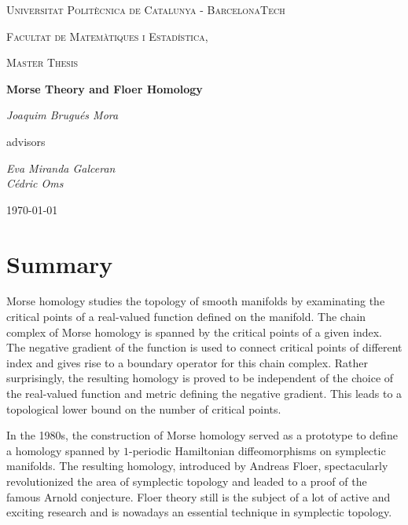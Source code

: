 \documentclass[a4paper,11pt]{book}
\begin{document}
\begin{titlepage}
	\centering
	{\scshape\LARGE Universitat Politècnica de Catalunya - BarcelonaTech\par}
	{\scshape\LARGE Facultat de Matemàtiques i Estadística, \par}
	\vspace{1cm}
	{\scshape\Large Master Thesis\par}
	\vspace{1.5cm}
	{\huge\bfseries Morse Theory and Floer Homology\par}
	\vspace{2cm}
	{\Large\itshape Joaquim Brugués Mora\par}
	\vfill
	advisors\par
	{\Large\itshape Eva Miranda Galceran \\ Cédric Oms \par}

	\vfill

	{\large \today\par}
\end{titlepage}


\chapter*{Summary}

Morse homology studies the topology of smooth manifolds by examinating the critical points of a real-valued function defined on the manifold. The chain complex of Morse homology is spanned by the critical points of a given index. The negative gradient of the function is used to connect critical points of different index and gives rise to a boundary operator for this chain complex. Rather surprisingly, the resulting homology is proved to be independent of the choice of the real-valued function and metric defining the negative gradient. This leads to a topological lower bound on the number of critical points.

In the 1980s, the construction of Morse homology served as a prototype to define a homology spanned by $1$-periodic Hamiltonian diffeomorphisms on symplectic manifolds. The resulting homology, introduced by Andreas Floer, spectacularly revolutionized the area of symplectic topology and leaded to a proof of the famous Arnold conjecture. Floer theory still is the subject of a lot of active and exciting research and is nowadays an essential technique in symplectic topology.
\end{document}
